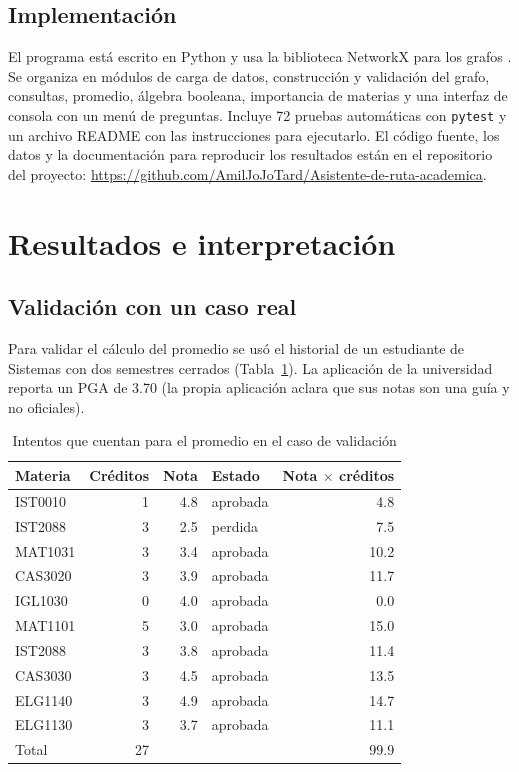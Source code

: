 \documentclass[11pt,a4paper]{article}
\begin{document}
\subsection{Implementación}
El programa está escrito en Python y usa la biblioteca NetworkX para los grafos \parencite{hagberg2008}. Se organiza en módulos de carga de datos, construcción y validación del grafo, consultas, promedio, álgebra booleana, importancia de materias y una interfaz de consola con un menú de preguntas. Incluye 72 pruebas automáticas con \texttt{pytest} y un archivo README con las instrucciones para ejecutarlo. El código fuente, los datos y la documentación para reproducir los resultados están en el repositorio del proyecto: \url{https://github.com/AmilJoJoTard/Asistente-de-ruta-academica}.

\section{Resultados e interpretación}

\subsection{Validación con un caso real}
Para validar el cálculo del promedio se usó el historial de un estudiante de Sistemas con dos semestres cerrados (Tabla~\ref{tab:validacion}). La aplicación de la universidad reporta un PGA de 3.70 (la propia aplicación aclara que sus notas son una guía y no oficiales).

\begin{table}[htbp]
\centering
\caption{Intentos que cuentan para el promedio en el caso de validación}
\label{tab:validacion}
\begin{tabular}{lrrlr}
\toprule
Materia & Créditos & Nota & Estado & Nota $\times$ créditos \\
\midrule
IST0010 & 1 & 4.8 & aprobada & 4.8 \\
IST2088 & 3 & 2.5 & perdida & 7.5 \\
MAT1031 & 3 & 3.4 & aprobada & 10.2 \\
CAS3020 & 3 & 3.9 & aprobada & 11.7 \\
IGL1030 & 0 & 4.0 & aprobada & 0.0 \\
MAT1101 & 5 & 3.0 & aprobada & 15.0 \\
IST2088 & 3 & 3.8 & aprobada & 11.4 \\
CAS3030 & 3 & 4.5 & aprobada & 13.5 \\
ELG1140 & 3 & 4.9 & aprobada & 14.7 \\
ELG1130 & 3 & 3.7 & aprobada & 11.1 \\
\midrule
Total & 27 & & & 99.9 \\
\bottomrule
\end{tabular}
\end{table}
\end{document}
